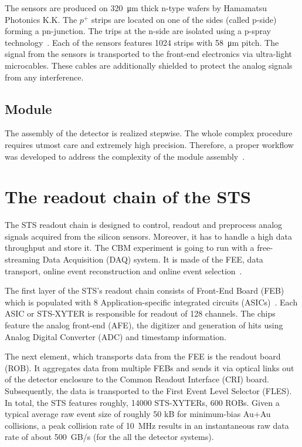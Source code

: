 The sensors are produced on \SI{320}{\micro\metre} thick n-type wafers by Hamamatsu Photonics K.K. The $p^{+}$ strips are located on one of the sides (called p-side) forming a pn-junction. The trips at the n-side are isolated using a p-spray technology~\cite{Heuser:54798}. Each of the sensors features 1024 strips with \SI{58}{\micro\metre} pitch. The signal from the sensors is transported to the front-end electronics via ultra-light microcables. These cables are additionally shielded to protect the analog signals from any interference. 
\subsection{Module}
\label{module}
 The assembly of the detector is realized stepwise. The whole complex procedure requires utmost care and extremely high precision. Therefore, a proper workflow was developed to address the complexity of the module assembly~\cite{carmen2}.

\section{The readout chain of the STS}
\label{readout}
\label{DAQ}
The \gls{STS} readout chain is designed to control, readout and preprocess analog signals acquired from the silicon sensors. Moreover, it has to handle a high data throughput and store it. The \gls{CBM} experiment is going to run with a free-streaming Data Acquisition (\gls{DAQ}) system. It is made of the \gls{FEE}, data transport, online event reconstruction and online event selection~\cite{Kasinski1}.

The first layer of the \gls{STS}'s readout chain consists of Front-End Board (\gls{FEB}) which is populated with 8  Application-specific integrated circuits (ASICs)~\cite{Kasinski2}. Each ASIC or STS-XYTER is responsible for readout of 128 channels. The chips feature the analog front-end (\gls{AFE}), the digitizer and generation of hits using Analog Digital Converter (\gls{ADC}) and timestamp information. 

The next element, which transports data from the \gls{FEE} is the readout board (\gls{ROB}). It aggregates data from multiple \glspl{FEB} and sends it via optical links out of the detector enclosure to the Common Readout Interface (\gls{CRI}) board. Subsequently, the data is transported to the First Event Level Selector (\gls{FLES}). 
\newpage
In total, the \gls{STS} features roughly, 14000 STS-XYTERs, 600 \glspl{ROB}. Given a typical average raw event size of roughly 50 kB for minimum-bias Au+Au collisions, a peak collision rate of 10~MHz results in an instantaneous raw data rate of about 500~GB/s (for the all the detector systems).

